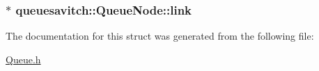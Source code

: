 \subsubsection[{\texorpdfstring{link}{link}}]{$\ast$ queuesavitch\+::\+Queue\+Node\+::link}\hypertarget{structqueuesavitch_1_1QueueNode_add6ebeca47fc7ab55c99a33827cb68c4}{}\label{structqueuesavitch_1_1QueueNode_add6ebeca47fc7ab55c99a33827cb68c4}


The documentation for this struct was generated from the following file\+:\begin{DoxyCompactItemize}
\item 
\hyperlink{Queue_8h}{Queue.\+h}\end{DoxyCompactItemize}
